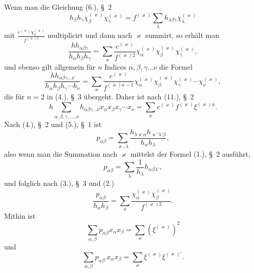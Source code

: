\documentclass[11pt]{article}
\begin{document}
Wenn man die Gleichung (6.), \S~2
\[
h_\beta h_\gamma\chi_\beta^{(\varkappa)}\chi_\gamma^{(\varkappa)}=f^{(\varkappa)}\sum_\lambda h_{\lambda\beta\gamma}\chi_\lambda^{(\varkappa)}
\]
mit $\frac{e^{(\varkappa)}\chi_\alpha^{(\varkappa)}}{f^{(\varkappa)2}}$ multiplicirt und dann nach $\varkappa$ summirt, so erhält man
\begin{equation*}\tag{1.}
\frac{h h_{\alpha\beta\gamma}}{h_\alpha h_\beta h_\gamma}=\sum_\varkappa \frac{e^{(\varkappa)}}{f^{(\varkappa)2}}\chi_\alpha^{(\varkappa)}\chi_\beta^{(\varkappa)}\chi_\gamma^{(\varkappa)},
\end{equation*}
und ebenso gilt allgemein für $n$ Indices $\alpha,\beta,\gamma\ldots\nu$ die Formel
\begin{equation*}\tag{2.}
\frac{h h_{\alpha\beta\gamma\ldots\nu}}{h_\alpha h_\beta h_\gamma\cdots h_\nu}
=\sum_\varkappa \frac{e^{(\varkappa)}}{f^{(\varkappa)n-1}}\chi_\alpha^{(\varkappa)}\chi_\beta^{(\varkappa)}\chi_\gamma^{(\varkappa)}\cdots\chi_\nu^{(\varkappa)},
\end{equation*}
die für $n=2$ in (4.), \S~3 übergeht. Daher ist nach (11.), \S~2
\begin{equation*}\tag{3.}
h\sum_{\alpha,\beta,\gamma,\ldots,\nu}h_{\alpha\beta\gamma\ldots\nu}x_\alpha x_\beta x_\gamma\cdots x_\nu=\sum_\varkappa e^{(\varkappa)}f^{(\varkappa)}\xi^{(\varkappa)n}.
\end{equation*}
Nach (4.), \S~2 und (5.), \S~1 ist
\[
p_{\alpha\beta}=\sum_{\varkappa,\lambda}\frac{h_{\lambda\varkappa\alpha}h_{\varkappa'\lambda'\beta}}{h_\varkappa h_\lambda},
\]
also wenn man die Summation nach $\varkappa$ mittelst der Formel (1.), \S~2 ausführt,
\begin{equation*}\tag{4.}
p_{\alpha\beta}=\sum_\lambda \frac{1}{h_\lambda}h_{\alpha\beta\lambda'},
\end{equation*}
und folglich nach (3.), \S~3 und (2.)
\begin{equation*}\tag{5.}
\frac{p_{\alpha\beta}}{h_\alpha h_\beta}=\sum_\varkappa \frac{\chi_\alpha^{(\varkappa)}\chi_\beta^{(\varkappa)}}{f^{(\varkappa)2}}.
\end{equation*}
Mithin ist
\begin{equation*}\tag{6.}
\sum_{\alpha,\beta}p_{\alpha\beta}x_\alpha x_\beta=\sum_\varkappa(\xi^{(\varkappa)})^2
\end{equation*}
und
\begin{equation*}\tag{7.}
\sum_{\alpha,\beta}p_{\alpha\beta'}x_\alpha x_\beta=\sum_\varkappa \xi^{(\varkappa)}\xi^{(\varkappa)'}.
\end{equation*}
\end{document}
